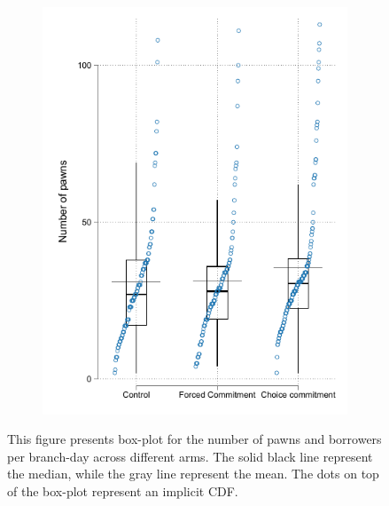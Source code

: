 \begin{figure}[H]
\begin{center}
\begin{subfigure}{0.45\textwidth}
        \includegraphics[width=\textwidth]{Figuras/box_plot_num_pawns.pdf}
    \end{subfigure}
    \end{center}
    \scriptsize
        This figure presents box-plot for the number of pawns and borrowers per branch-day across different arms. The solid black line represent the median, while the gray line represent the mean. The dots on top of the box-plot represent an implicit CDF. 
\end{figure}




